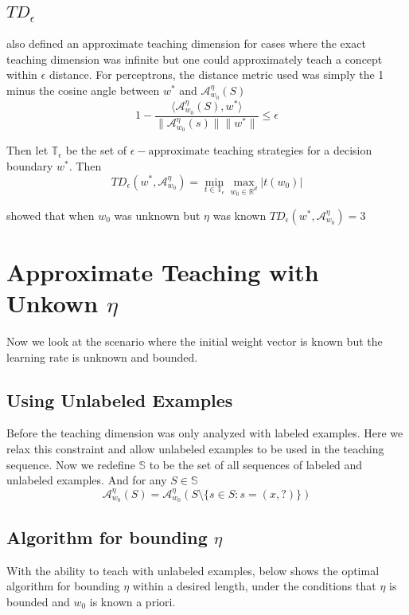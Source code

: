 \documentclass{article}
\newcommand{\learn}{\mathcal{A}_{w_0}^\eta}
\begin{document}
\subsection{$TD_\epsilon$}
\cite{perceptron} also defined an approximate teaching dimension for cases where the exact teaching dimension was infinite but one could approximately teach a concept within $\epsilon$ distance. For perceptrons, the distance metric used was simply the 1 minus the cosine angle between $w^*$ 
and $\learn(S)$
$$
1 -\frac{\langle \learn(S), w^* \rangle}{\lVert \learn(s) \rVert \lVert w^* \rVert} \leq \epsilon
$$

Then let $\mathbb{T}_\epsilon$ be the set of $\epsilon-\text{approximate}$ teaching strategies for a decision boundary $w^*$. Then
$$
TD_\epsilon(w^*, \learn) = \min_{t \in 
\mathbb{T}_\epsilon} \max_{w_0 \in 
\mathbb{R}^d} \lvert t(w_0) \rvert
$$

\cite{perceptron} showed that when $w_0$ was unknown but $\eta$ was known $TD_\epsilon(w^*, \learn) = 3$

\section{Approximate Teaching with Unkown $\eta$}
Now we look at the scenario where the initial weight vector is known but the learning rate is unknown and bounded.

\subsection{Using Unlabeled Examples}
Before the teaching dimension was only analyzed with labeled examples. Here we relax this constraint and allow unlabeled examples to be used in the teaching sequence. Now we redefine $\mathbb{S}$ to be the set of all sequences of labeled and unlabeled examples. And for any $S \in \mathbb{S}$
$$
\learn(S) = \learn(S \setminus \{s \in S : s = (x, ?)\} )
$$

\subsection{Algorithm for bounding $\eta$}
With the ability to teach with unlabeled examples, below shows the optimal algorithm for bounding $\eta$ within a desired length, under the conditions that $\eta$ is bounded and $w_0$ is known a priori.
\end{document}
